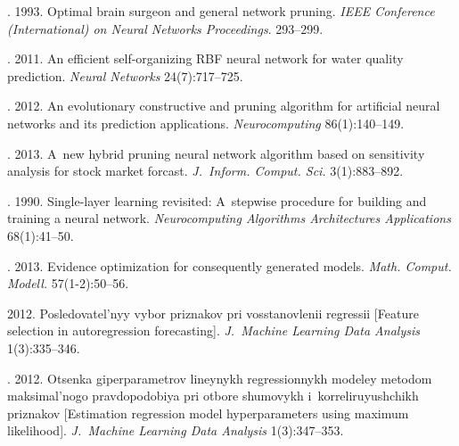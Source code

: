 \begin{multicols}{2}
{{\begin{thebibliography}{99}
.
1993. Optimal brain surgeon and general network pruning.
\textit{IEEE Conference (International) on Neural Networks Proceedings}. 293--299.

. 2011.
An efficient self-organizing {RBF} neural network for water quality prediction.
\textit{Neural Networks} 24(7):717--725.

.
2012. An evolutionary constructive and pruning algorithm for artificial
neural networks and its prediction applications.
\textit{Neurocomputing} 86(1):140--149.
{

}

.
2013. A~new hybrid pruning neural network algorithm based on sensitivity analysis
for stock market forcast. \textit{J.~Inform. Comput. Sci.} 3(1):883--892.
{

}

.
1990. Single-layer learning revisited: A~stepwise procedure for building
 and training a neural network.
\textit{Neurocomputing Algorithms Architectures Applications} 68(1):41--50.



.
2013. Evidence optimization for consequently generated models.
\textit{Math. Comput. Modell.} 57(1-2):50--56.

2012. Posledovatel'nyy vybor priznakov pri vosstanovlenii regressii
[Feature selection in autoregression forecasting].
\textit{J.~Machine Learning Data Analysis} 1(3):335--346.

.
2012. Otsenka giperparametrov lineynykh regressionnykh modeley
metodom maksimal'nogo pravdopodobiya pri otbore shumovykh
i~korreliruyushchikh priznakov
[Estimation regression model hyperparameters using
    maximum likelihood]. \textit{J.~Machine Learning Data Analysis} 1(3):347--353.

\columnbreak


\end{thebibliography}}}
\end{multicols}
